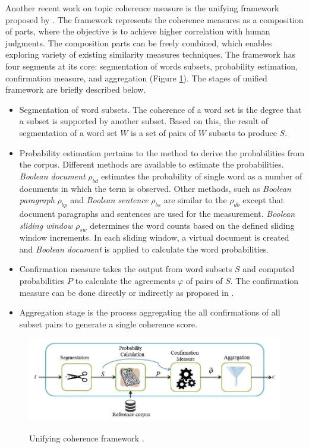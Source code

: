 Another recent work on topic coherence measure is the unifying framework proposed by \cite{Roder2015}. The framework represents the coherence measures as a composition of parts, where the objective is to achieve higher correlation with human judgments. The composition parts can be freely combined, which enables exploring variety of existing similarity measures techniques. The framework has four segments at its core: segmentation of words subsets, probability estimation, confirmation measure, and aggregation (Figure \ref{fig:coherence}). The stages of unified framework are briefly described below. 
\begin{itemize}
    \item Segmentation of word subsets. The coherence of a word set is the  degree that a subset is supported by another subset. Based on this, the result of segmentation of a word set $W$ is a set of pairs of $W$ subsets to produce $S$.  

    \item Probability estimation pertains to the method to derive the probabilities from the corpus. Different methods are available to estimate the probabilities. \textit{Boolean document} $\rho_{bd}$ estimates the probability of single word as a number of documents in which the term is observed. Other methods, such as \textit{Boolean paragraph} $\rho_{bp}$ and \textit{Boolean sentence} $\rho_{bs}$ are similar to the $\rho_{db}$ except that document paragraphs and sentences are used for the measurement. \textit{Boolean sliding window} $\rho_{sw}$ determines the word counts based on the defined sliding window increments. In each sliding window, a virtual document is created and \textit{Boolean document} is applied to calculate the word probabilities. 
    
    \item Confirmation measure takes the output from word subsets $S$ and computed probabilities $P$ to calculate the agreements $\varphi$ of pairs of $S$. The confirmation measure can be done directly \cite{douven2007} or indirectly as proposed in \cite{Aletras}. 
    
    \item Aggregation stage is the process aggregating the all confirmations of all subset pairs to generate a single coherence score.
    
\end{itemize}

\begin{figure}[t]
\caption{Unifying coherence framework \cite{Roder2015}.}
\includegraphics[scale=.5]{img/coherence.jpg}
\centering
\label{fig:coherence}
\end{figure}


